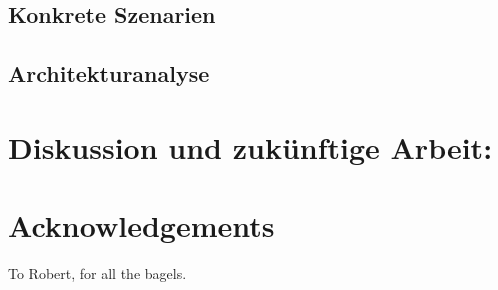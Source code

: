 \documentclass{acmsiggraph}
\begin{document}
\subsection{Konkrete Szenarien}

\subsection{Architekturanalyse}

\section{Diskussion und zukünftige Arbeit:}



\section*{Acknowledgements}

To Robert, for all the bagels.


\nocite{*}

\end{document}
